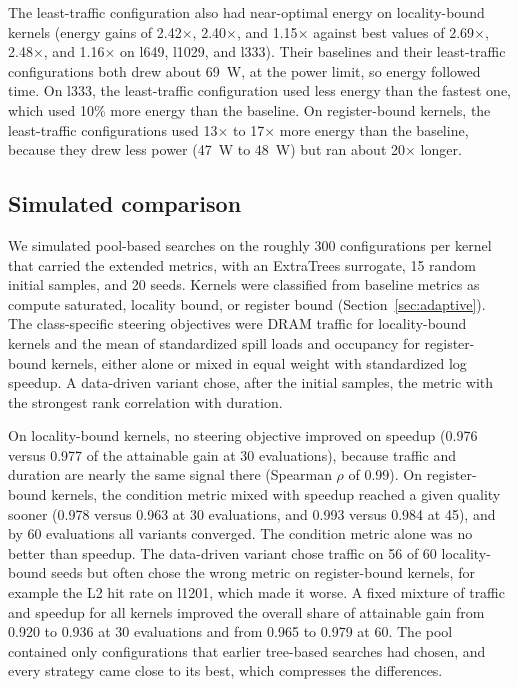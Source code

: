 \documentclass[10pt]{article}
\newcommand{\x}{\ensuremath{\times}}
\begin{document}
The least-traffic configuration also had near-optimal energy on
locality-bound kernels (energy gains of 2.42\x{}, 2.40\x{}, and 1.15\x{}
against best values of 2.69\x{}, 2.48\x{}, and 1.16\x{} on l649, l1029, and
l333). Their baselines and their least-traffic configurations both drew about
69~W, at the power limit, so energy followed time. On l333, the least-traffic
configuration used less energy than the fastest one, which used 10\% more
energy than the baseline. On register-bound kernels, the least-traffic
configurations used 13\x{} to 17\x{} more energy than the baseline, because
they drew less power (47~W to 48~W) but ran about 20\x{} longer.

\subsection{Simulated comparison}
We simulated pool-based searches on the roughly 300 configurations per kernel
that carried the extended metrics, with an ExtraTrees surrogate, 15 random
initial samples, and 20 seeds. Kernels were classified from baseline metrics
as compute saturated, locality bound, or register bound
(Section~\ref{sec:adaptive}). The class-specific steering objectives were
DRAM traffic for locality-bound kernels and the mean of standardized spill
loads and occupancy for register-bound kernels, either alone or mixed in
equal weight with standardized log speedup. A data-driven variant chose,
after the initial samples, the metric with the strongest rank correlation
with duration.

On locality-bound kernels, no steering objective improved on speedup
(0.976 versus 0.977 of the attainable gain at 30 evaluations), because
traffic and duration are nearly the same signal there (Spearman $\rho$ of
0.99). On register-bound kernels, the condition metric mixed with speedup
reached a given quality sooner (0.978 versus 0.963 at 30 evaluations, and
0.993 versus 0.984 at 45), and by 60 evaluations all variants converged.
The condition metric alone was no better than speedup. The data-driven
variant chose traffic on 56 of 60 locality-bound seeds but often chose the
wrong metric on register-bound kernels, for example the L2 hit rate on
l1201, which made it worse. A fixed mixture of traffic and speedup for all
kernels improved the overall share of attainable gain from 0.920 to 0.936 at
30 evaluations and from 0.965 to 0.979 at 60. The pool contained only
configurations that earlier tree-based searches had chosen, and every
strategy came close to its best, which compresses the differences.
\end{document}
